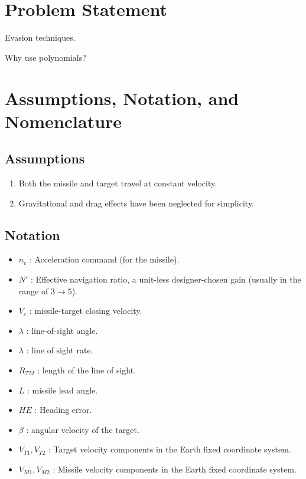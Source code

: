 \section{Problem Statement}
Evasion techniques.

Why use polynomials?

\section{Assumptions, Notation, and Nomenclature}
\subsection*{Assumptions}

\begin{enumerate}
	\item Both the missile and target travel at constant velocity.
	\item Gravitational and drag effects have been neglected for simplicity.
\end{enumerate}

\subsection*{Notation}
\begin{itemize}
	\item $n_c$ : Acceleration command (for the missile).
	\item $N'$ : Effective navigation ratio, a unit-less designer-chosen gain (usually in the range of $3\to5$).
	\item $V_c$ : missile-target closing velocity.
	\item $\lambda$ : line-of-sight angle.
	\item $\dot{\lambda}$ : line of sight rate.
	\item $R_{TM}$ : length of the line of sight.
	\item $L$ : missile lead angle.
	\item $HE$ : Heading error.
	\item $\dot{\beta}$ : angular velocity of the target.
	\item $V_{T1},V_{T2}$ : Target velocity components in the Earth fixed coordinate system.
	\item $V_{M1},V_{M2}$ : Missile velocity components in the Earth fixed coordinate system.
\end{itemize}
